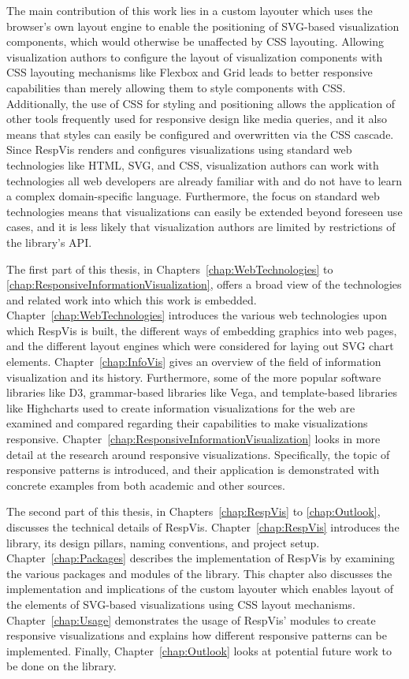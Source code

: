 The main contribution of this work lies in a custom layouter which
uses the browser's own layout engine to enable the positioning of
SVG-based visualization components, which would otherwise be
unaffected by CSS layouting. Allowing visualization authors to
configure the layout of visualization components with CSS layouting
mechanisms like Flexbox and Grid leads to better responsive
capabilities than merely allowing them to style components with CSS.
Additionally, the use of CSS for styling and positioning allows the
application of other tools frequently used for responsive design like
media queries, and it also means that styles can easily be configured
and overwritten via the CSS cascade. Since RespVis renders and
configures visualizations using standard web technologies like HTML,
SVG, and CSS, visualization authors can work with technologies all web
developers are already familiar with and do not have to learn a
complex domain-specific language. Furthermore, the focus on standard
web technologies means that visualizations can easily be extended
beyond foreseen use cases, and it is less likely that visualization
authors are limited by restrictions of the library's API.



The first part of this thesis, in Chapters~\ref{chap:WebTechnologies}
to \ref{chap:ResponsiveInformationVisualization}, offers a broad view
of the technologies and related work into which this work is
embedded. Chapter~\ref{chap:WebTechnologies} introduces the various
web technologies upon which RespVis is built, the different ways of
embedding graphics into web pages, and the different layout engines
which were considered for laying out SVG chart elements.
Chapter~\ref{chap:InfoVis} gives an overview of the field of
information visualization and its history. Furthermore, some of the
more popular software libraries like D3, grammar-based libraries like
Vega, and template-based libraries like Highcharts used to create
information visualizations for the web are examined and compared
regarding their capabilities to make visualizations responsive.
Chapter~\ref{chap:ResponsiveInformationVisualization} looks in more
detail at the research around responsive visualizations.
Specifically, the topic of responsive patterns is introduced, and
their application is demonstrated with concrete examples from both
academic and other sources.

The second part of this thesis, in Chapters~\ref{chap:RespVis} to
\ref{chap:Outlook}, discusses the technical details of RespVis.
Chapter~\ref{chap:RespVis} introduces the library, its design pillars,
naming conventions, and project setup. Chapter~\ref{chap:Packages}
describes the implementation of RespVis by examining the various
packages and modules of the library. This chapter also discusses the
implementation and implications of the custom layouter which enables
layout of the elements of SVG-based visualizations using CSS layout
mechanisms. Chapter~\ref{chap:Usage} demonstrates the usage of
RespVis' modules to create responsive visualizations and explains how
different responsive patterns can be implemented. Finally,
Chapter~\ref{chap:Outlook} looks at potential future work to be done
on the library.

